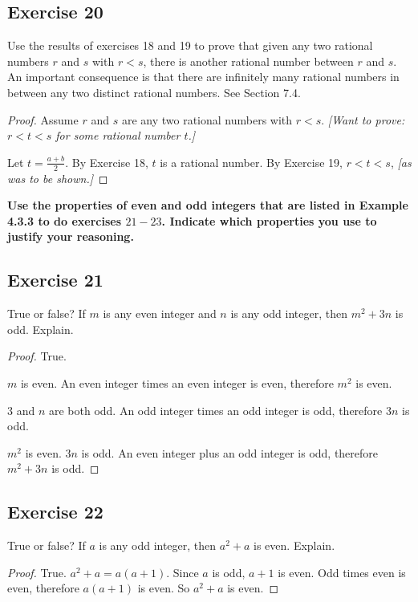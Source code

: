 \documentclass[14pt]{extarticle}
\newcommand{\cy}{\color{cyan}}
\begin{document}
\subsection{Exercise 20}
Use the results of exercises 18 and 19 to prove that given any two rational numbers $r$ and $s$ with $r < s$, there is another rational number between $r$ and $s$. An important consequence is that there are infinitely many rational numbers in between any two distinct rational numbers. See Section 7.4.

\begin{proof}
    Assume $r$ and $s$ are any two rational numbers with $r < s$. {\it [Want to prove: $r < t < s$ for some rational number $t$.]}

    Let $t = \frac{a+b}{2}$. By Exercise 18, $t$ is a rational number. By Exercise 19, $r < t < s$, {\it [as was to be shown.]}
\end{proof}

{\bf \cy Use the properties of even and odd integers that are listed in Example 4.3.3 to do exercises $21-23$. Indicate which properties you use to justify your reasoning.}

\subsection{Exercise 21}
True or false? If $m$ is any even integer and $n$ is any
odd integer, then $m^2 + 3n$ is odd. Explain.

\begin{proof}
    True.

    $m$ is even. An even integer times an even integer is even, therefore $m^2$ is even.

    $3$ and $n$ are both odd. An odd integer times an odd integer is odd, therefore $3n$ is odd.

    $m^2$ is even. $3n$ is odd. An even integer plus an odd integer is odd, therefore $m^2 + 3n$ is odd.
\end{proof}

\subsection{Exercise 22}
True or false? If $a$ is any odd integer, then $a^2 + a$ is
even. Explain.

\begin{proof}
    True. $a^2 + a = a(a+1)$. Since $a$ is odd, $a+1$ is even. Odd times even is even, therefore $a(a+1)$ is even. So $a^2+a$ is even.
\end{proof}
\end{document}
